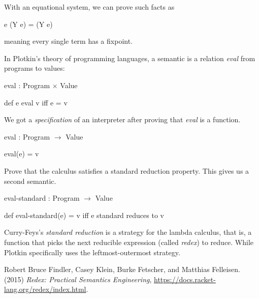 With an equational system, we can prove such facts as

\centerline{e (Y e) = (Y e)}

meaning every single term has a fixpoint.

In Plotkin's theory of programming languages, a semantic is a relation
\textit{eval} from programs to values:

\centerline{eval : Program $\times$ Value}

\centerline{def e eval v iff e = v}

We got a \textit{specification} of an interpreter after proving that
\textit{eval} is a function.

\centerline{eval : Program $\rightarrow$ Value}

\centerline{eval(e) = v}

Prove that the calculus satisfies a standard reduction property. This gives us a
second semantic.

\centerline{eval-standard : Program $\rightarrow$ Value}

\centerline{def eval-standard(e) = v iff e standard reduces to v}

Curry-Feys's \textit{standard reduction} is a strategy for the lambda calculus,
that is, a function that picks the next reducible expression (called
\textit{redex}) to reduce. While Plotkin specifically uses the
leftmost-outermost strategy.

\begin{thebibliography}{9}
Robert Bruce Findler, Casey Klein, Burke Fetscher, and Matthias Felleisen.
(2015) \emph{Redex: Practical Semantics Engineering},
\url{https://docs.racket-lang.org/redex/index.html}.
\end{thebibliography}
